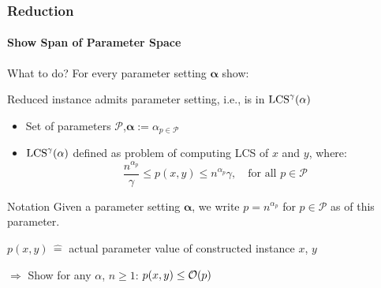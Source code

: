 \begin{frame}
\frametitle{Reduction}
\framesubtitle{Show Span of Parameter Space}

\begin{alertblock}{What to do?}
    For every parameter setting $\mathbf{\alpha}$ show:
    
    Reduced instance admits parameter setting, i.e., is in $\text{LCS}^\gamma(\mathbb{\alpha})$
\end{alertblock}

\begin{definition}
		\begin{itemize}
			\setlength{\itemindent}{1em}
			\item Set of parameters $\mathcal{P}$,\quad $\mathbf{\alpha} := \alpha_{p \in \mathcal{P}}$
			\item $\text{LCS}^\gamma(\mathbf{\alpha})$ defined as problem of computing LCS of $x$ and $y$, where:
			\begin{displaymath}
				\frac{n^{\alpha_p}}{\gamma} \leq p(x,y) \leq n^{\alpha_p}\gamma, \quad \text{for all } p \in \mathcal{P}
			\end{displaymath}
		\end{itemize}
\end{definition}

\begin{exampleblock}{Notation}
    Given a parameter setting $\mathbf{\alpha}$, we write $p = n^{\alpha_p}$ for $p \in \mathcal{P}$ as  of this parameter.
    
    $p(x,y)\, \hat{=}$ actual parameter value of constructed instance $x$, $y$

	\vspace{2ex}    
    
    $\Rightarrow$ Show for any $\alpha$, $n \geq 1$: \quad\quad\quad $p(x,y) \leq \mathcal{O}(p)$
\end{exampleblock}

\end{frame}
